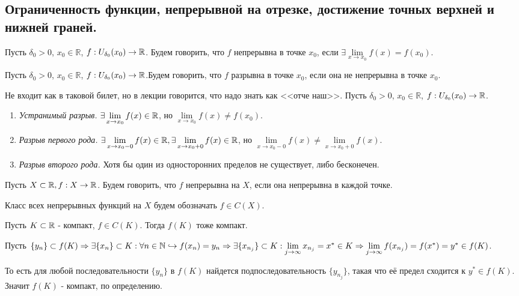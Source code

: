 \subsection{Ограниченность функции, непрерывной на отрезке, достижение точных верхней и нижней граней.}

\Def Пусть $\delta_0 > 0$, $x_0 \in \mathbb{R}$, $f: U_{\delta_0} (x_0) \to \mathbb{R}$. Будем говорить, что $f$ непрерывна в точке $x_0$, если $\exists \lim\limits_{x \to x_0} f(x) = f(x_0)$.

\Def Пусть $\delta_0 > 0$, $x_0 \in \mathbb{R}$, $f: U_{\delta_0} (x_0) \to \mathbb{R}$.Будем говорить, что $f$ разрывна в точке $x_0$, если она не непрерывна в точке $x_0$.

\Note Не входит как в таковой билет, но в лекции говорится, что надо знать как <<отче наш>>. Пусть $\delta_0 > 0$, $x_0 \in \mathbb{R}$, $f: U_{\delta_0} (x_0) \to \mathbb{R}$.
\begin{enumerate}
    \item \textit{Устранимый разрыв.} $\exists \lim\limits_{x \to x_0} f(x) \in \mathbb{R}$, но $\lim\limits_{x \to x_0} f(x) \neq f(x_0)$.
    \item \textit{Разрыв первого рода.} $\exists \lim\limits_{x \to x_0 - 0} f(x) \in \mathbb{R}, \exists \lim\limits_{x \to x_0 + 0} f(x) \in \mathbb{R}$, но $\lim\limits_{x \to x_0 - 0} f(x) \neq \lim\limits_{x \to x_0 + 0} f(x)$.
    \item \textit{Разрыв второго рода.} Хотя бы один из односторонних пределов не существует, либо бесконечен.
\end{enumerate}

\Def Пусть $X \subset \mathbb{R}, f: X \to \mathbb{R}$. Будем говорить, что $f$ непрерывна на $X$, если она непрерывна в каждой точке.

\Def Класс всех непрерывных функций на $X$ будем обозначать $f \in C(X)$.

\Th Пусть $K \subset \mathbb{R}$ - компакт, $f \in C(K)$. Тогда $f(K)$ тоже компакт.

\Proof

Пусть $\{y_n\} \subset f(K) \Rightarrow \exists \{x_n\} \subset K: \forall n \in \mathbb{N} \hookrightarrow f(x_n) = y_n \Rightarrow \exists \{x_{n_j}\} \subset K: \lim\limits_{j \to \infty} x_{n_j} = x^* \in K \Rightarrow \lim\limits_{j \to \infty} f(x_{n_j}) = f(x^*) = y^* \in f(K)$.

То есть для любой последовательности $\{y_n\}$ в $f(K)$ найдется подпоследовательность $\{y_{n_j}\}$, такая что её предел сходится к $y^* \in f(K)$. Значит $f(K)$ - компакт, по определению.

\Endproof
